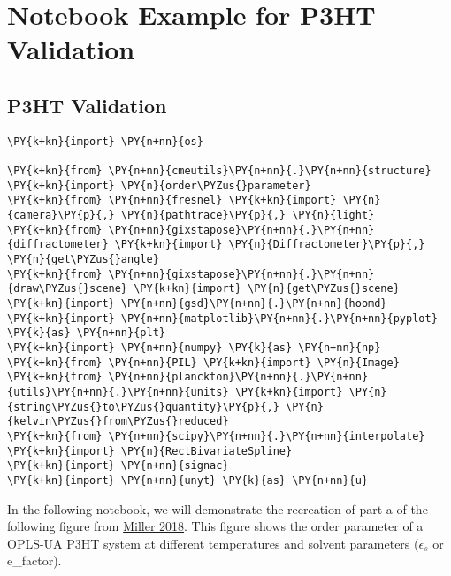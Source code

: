 \chapter{Notebook Example for P3HT Validation}
\label{app:p3ht_nb}

\newpage %

    \hypertarget{p3ht-validation}{%
\section{P3HT Validation}\label{p3ht-validation}}

    \begin{tcolorbox}[breakable, size=fbox, boxrule=1pt, pad at break*=1mm,colback=cellbackground, colframe=cellborder]
\begin{Verbatim}[commandchars=\\\{\}]
\PY{k+kn}{import} \PY{n+nn}{os}

\PY{k+kn}{from} \PY{n+nn}{cmeutils}\PY{n+nn}{.}\PY{n+nn}{structure} \PY{k+kn}{import} \PY{n}{order\PYZus{}parameter}
\PY{k+kn}{from} \PY{n+nn}{fresnel} \PY{k+kn}{import} \PY{n}{camera}\PY{p}{,} \PY{n}{pathtrace}\PY{p}{,} \PY{n}{light}
\PY{k+kn}{from} \PY{n+nn}{gixstapose}\PY{n+nn}{.}\PY{n+nn}{diffractometer} \PY{k+kn}{import} \PY{n}{Diffractometer}\PY{p}{,} \PY{n}{get\PYZus{}angle}
\PY{k+kn}{from} \PY{n+nn}{gixstapose}\PY{n+nn}{.}\PY{n+nn}{draw\PYZus{}scene} \PY{k+kn}{import} \PY{n}{get\PYZus{}scene}
\PY{k+kn}{import} \PY{n+nn}{gsd}\PY{n+nn}{.}\PY{n+nn}{hoomd}
\PY{k+kn}{import} \PY{n+nn}{matplotlib}\PY{n+nn}{.}\PY{n+nn}{pyplot} \PY{k}{as} \PY{n+nn}{plt}
\PY{k+kn}{import} \PY{n+nn}{numpy} \PY{k}{as} \PY{n+nn}{np}
\PY{k+kn}{from} \PY{n+nn}{PIL} \PY{k+kn}{import} \PY{n}{Image}
\PY{k+kn}{from} \PY{n+nn}{planckton}\PY{n+nn}{.}\PY{n+nn}{utils}\PY{n+nn}{.}\PY{n+nn}{units} \PY{k+kn}{import} \PY{n}{string\PYZus{}to\PYZus{}quantity}\PY{p}{,} \PY{n}{kelvin\PYZus{}from\PYZus{}reduced}
\PY{k+kn}{from} \PY{n+nn}{scipy}\PY{n+nn}{.}\PY{n+nn}{interpolate} \PY{k+kn}{import} \PY{n}{RectBivariateSpline}
\PY{k+kn}{import} \PY{n+nn}{signac}
\PY{k+kn}{import} \PY{n+nn}{unyt} \PY{k}{as} \PY{n+nn}{u}
\end{Verbatim}
\end{tcolorbox}

    In the following notebook, we will demonstrate the recreation of part a
of the following figure from
\href{http://www.mdpi.com/2073-4360/10/12/1305}{Miller 2018}. This
figure shows the order parameter of a OPLS-UA P3HT system at different
temperatures and solvent parameters (\(\epsilon_{s}\) or e\_factor).

